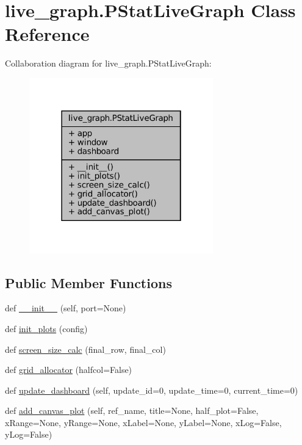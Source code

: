 \hypertarget{classlive__graph_1_1PStatLiveGraph}{}\section{live\+\_\+graph.\+P\+Stat\+Live\+Graph Class Reference}
\label{classlive__graph_1_1PStatLiveGraph}


Collaboration diagram for live\+\_\+graph.\+P\+Stat\+Live\+Graph\+:\nopagebreak
\begin{figure}[H]
\begin{center}
\leavevmode
\includegraphics[width=226pt]{de/d56/classlive__graph_1_1PStatLiveGraph__coll__graph}
\end{center}
\end{figure}
\subsection*{Public Member Functions}
\begin{DoxyCompactItemize}
\item 
def \hyperlink{classlive__graph_1_1PStatLiveGraph_a210a499fd4e06392f8f5fffc209971a4}{\+\_\+\+\_\+init\+\_\+\+\_\+} (self, port=None)
\item 
def \hyperlink{classlive__graph_1_1PStatLiveGraph_a65b6193384abea9656044a84a6112eb2}{init\+\_\+plots} (config)
\item 
def \hyperlink{classlive__graph_1_1PStatLiveGraph_a7730f214090df612485e42ae758beb3e}{screen\+\_\+size\+\_\+calc} (final\+\_\+row, final\+\_\+col)
\item 
def \hyperlink{classlive__graph_1_1PStatLiveGraph_a4969c53cd50f31c9b50d86a7cac77a63}{grid\+\_\+allocator} (halfcol=False)
\item 
def \hyperlink{classlive__graph_1_1PStatLiveGraph_af167003562729fe08284e8f5675b26e2}{update\+\_\+dashboard} (self, update\+\_\+id=0, update\+\_\+time=0, current\+\_\+time=0)
\item 
def \hyperlink{classlive__graph_1_1PStatLiveGraph_abfe72ecd8755e0cc4870ecbd560d45c3}{add\+\_\+canvas\+\_\+plot} (self, ref\+\_\+name, title=None, half\+\_\+plot=False, x\+Range=None, y\+Range=None, x\+Label=None, y\+Label=None, x\+Log=False, y\+Log=False)
\end{DoxyCompactItemize}
